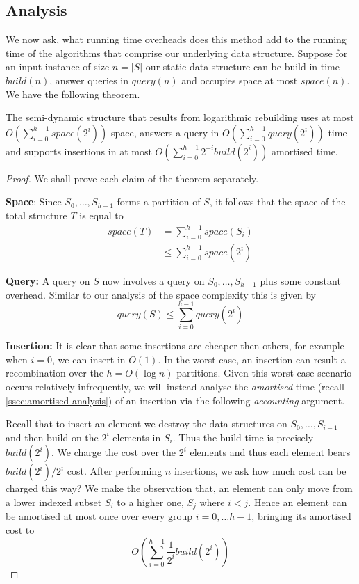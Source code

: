\subsection{Analysis}
\label{ssec:logarithmic-rebuilding-analysis}

We now ask, what running time overheads does this method add to the running time of the algorithms that comprise our underlying data structure. Suppose for an input instance of size $n = |S|$ our static data structure can be build in time $build(n)$, answer queries in $query(n)$ and occupies space at most $space(n)$. We have the following theorem.

\begin{theorem} The semi-dynamic structure that results from logarithmic rebuilding uses at most $O(\sum_{i=0}^{h-1}space(2^i))$ space, answers a query in $O(\sum_{i=0}^{h-1}query(2^i))$ time and supports insertions in at most $O(\sum_{i=0}^{h-1}2^{-i}build(2^i))$ amortised time.
\end{theorem}

\begin{proof}
    We shall prove each claim of the theorem separately. 

    \textbf{Space}: Since $S_0,\dots,S_{h-1}$ forms a partition of $S$, it follows that the space of the total structure $T$ is equal to 
    \begin{align*}
        space(T) &= \sum_{i=0}^{h-1}space(S_i) \\
               &\leq \sum_{i=0}^{h-1}space(2^i)
    \end{align*}

    \textbf{Query:}  A query on $S$ now involves a query on $S_0, \dots, S_{h-1}$ plus some constant overhead. Similar to our analysis of the space complexity this is given by 
    $$query(S)\leq \sum_{i=0}^{h-1}query(2^i)$$

    \textbf{Insertion:} It is clear that some insertions are cheaper then others, for example when $i=0$, we can insert in $O(1)$. In the worst case, an insertion can result a recombination over the $h = O(\log n)$ partitions. Given this worst-case scenario occurs relatively infrequently, we will instead analyse the \textit{amortised} time (recall \cref{ssec:amortised-analysis}) of an insertion via the following \textit{accounting} argument. 

    Recall that to insert an element we destroy the data structures on $S_0,\dots, S_{i-1}$ and then build on the $2^i$ elements in $S_i$. Thus the build time is precisely $build(2^i)$. We charge the cost over the $2^i$ elements and thus each element bears $build(2^i) / 2^i$ cost. After performing $n$ insertions, we ask how much cost can be charged this way?  We make the observation that, an element can only move from a lower indexed subset $S_i$ to a higher one, $S_j$ where $i < j$. Hence an element can be amortised at most once over every group $i = 0,\dots h-1$, bringing its amortised cost to  
    $$O\left(\sum_{i=0}^{h-1}\frac{1}{2^i}build(2^i)\right)$$
\end{proof}


